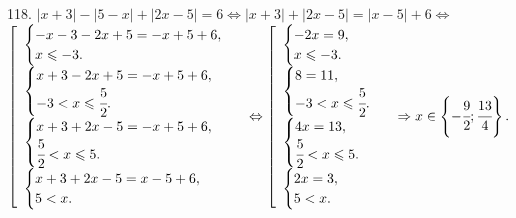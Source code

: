 \documentclass[12pt]{article}
\begin{document}
118. $|x+3|-|5-x|+|2x-5|=6\Leftrightarrow |x+3|+|2x-5|=|x-5|+6\Leftrightarrow$\\$ \left[\begin{array}{l}\begin{cases} -x-3-2x+5=-x+5+6,\\ x\leqslant-3.\end{cases}\\
\begin{cases} x+3-2x+5=-x+5+6,\\ -3<x\leqslant\cfrac{5}{2}.\end{cases}\\ \begin{cases} x+3+2x-5=-x+5+6,\\ \cfrac{5}{2}<x\leqslant5.\end{cases}\\
\begin{cases} x+3+2x-5=x-5+6,\\ 5< x.\end{cases}\end{array}\right.\Leftrightarrow \left[\begin{array}{l}\begin{cases} -2x=9,\\ x\leqslant-3.\end{cases}\\
\begin{cases} 8=11,\\ -3<x\leqslant\cfrac{5}{2}.\end{cases}\\ \begin{cases} 4x=13,\\ \cfrac{5}{2}<x\leqslant5.\end{cases}\\
\begin{cases} 2x=3,\\ 5< x.\end{cases}\end{array}\right.\Rightarrow x\in\left\{-\cfrac{9}{2};\cfrac{13}{4}\right\}.$\\
\end{document}
